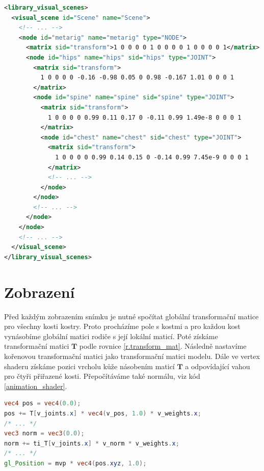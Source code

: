 \begin{lstlisting}[float,floatplacement=H,language=XML, caption={Ukázka uložení hierarchie kostry ve formátu COLLADA.}, label={collada_skeleton}]
<library_visual_scenes>
  <visual_scene id="Scene" name="Scene">
    <!-- ... -->
    <node id="metarig" name="metarig" type="NODE">
      <matrix sid="transform">1 0 0 0 0 1 0 0 0 0 1 0 0 0 0 1</matrix>
      <node id="hips" name="hips" sid="hips" type="JOINT">
        <matrix sid="transform">
          1 0 0 0 0 -0.16 -0.98 0.05 0 0.98 -0.167 1.01 0 0 0 1
        </matrix>
        <node id="spine" name="spine" sid="spine" type="JOINT">
          <matrix sid="transform">
            1 0 0 0 0 0.99 0.11 0.17 0 -0.11 0.99 1.49e-8 0 0 0 1
          </matrix>
          <node id="chest" name="chest" sid="chest" type="JOINT">
            <matrix sid="transform">
              1 0 0 0 0 0.99 0.14 0.15 0 -0.14 0.99 7.45e-9 0 0 0 1
            </matrix>
            <!-- ... -->
          </node>
        </node>
        <!-- ... -->
      </node>
    </node>
    <!-- ... -->
  </visual_scene>
</library_visual_scenes>
\end{lstlisting}

\section{Zobrazení}
Před každým zobrazením snímku je nutné spočítat globální transformační matice pro všechny kosti kostry. Proto procházíme pole s kostmi a pro každou kost vynásobíme globální matici rodiče s její lokální maticí. Poté získáme transformační matici $\mathbf{T}$ podle rovnice \ref{r.transform_mat}. Následně nastavíme kořenovou transformační matici jako transformační matici modelu. Dále ve vertex shaderu získáme pozici vrcholu kůže násobením maticí $\mathbf{T}$ a odpovídající vahou pro čtyři přiřazené kosti. Přepočítáváme také normálu, viz kód \ref{animation_shader}.

\begin{lstlisting}[float,floatplacement=H,language=GLSL, caption={Ukázka z vertex shaderu pro animovaný model. Výpočet pro pozici a normálu se provede \(4 \times \), pro komponenty \texttt{x}, \texttt{y}, \texttt{z} a \texttt{w} vektorů \texttt{v\_weights} a \texttt{v\_joints}.}, label={animation_shader}]
vec4 pos = vec4(0.0);
pos += T[v_joints.x] * vec4(v_pos, 1.0) * v_weights.x;
/* ... */
vec3 norm = vec3(0.0);
norm += ti_T[v_joints.x] * v_norm * v_weights.x;
/* ... */
gl_Position = mvp * vec4(pos.xyz, 1.0);
\end{lstlisting}

